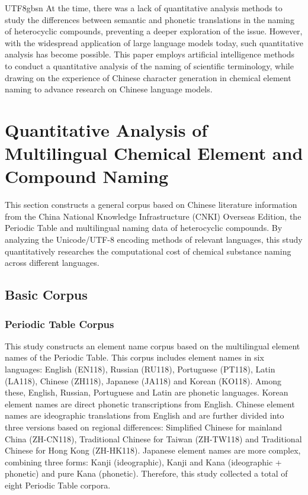 \documentclass[conference]{IEEEtran}
\begin{document}
\begin{CJK*}{UTF8}{gbsn}
At the time, there was a lack of quantitative analysis methods to study the differences between semantic and phonetic translations in the naming of heterocyclic compounds, preventing a deeper exploration of the issue. However, with the widespread application of large language models today, such quantitative analysis has become possible. This paper employs artificial intelligence methods to conduct a quantitative analysis of the naming of scientific terminology, while drawing on the experience of Chinese character generation in chemical element naming to advance research on Chinese language models.

\section{Quantitative Analysis of Multilingual Chemical Element and Compound Naming}
This section constructs a general corpus based on Chinese literature information from the China National Knowledge Infrastructure (CNKI) Overseas Edition, the Periodic Table and multilingual naming data of heterocyclic compounds. By analyzing the Unicode/UTF-8 encoding methods of relevant languages, this study quantitatively researches the computational cost of chemical substance naming across different languages.

\subsection{Basic Corpus}

\subsubsection{Periodic Table Corpus}

This study constructs an element name corpus based on the multilingual element names of the Periodic Table. This corpus includes element names in six languages: English (EN118), Russian (RU118), Portuguese (PT118), Latin (LA118), Chinese (ZH118), Japanese (JA118) and Korean (KO118). Among these, English, Russian, Portuguese and Latin are phonetic languages. Korean element names are direct phonetic transcriptions from English. Chinese element names are ideographic translations from English and are further divided into three versions based on regional differences: Simplified Chinese for mainland China (ZH-CN118), Traditional Chinese for Taiwan (ZH-TW118) and Traditional Chinese for Hong Kong (ZH-HK118). Japanese element names are more complex, combining three forms: Kanji (ideographic), Kanji and Kana (ideographic + phonetic) and pure Kana (phonetic). Therefore, this study collected a total of eight Periodic Table corpora.


\end{CJK*}
\end{document}
